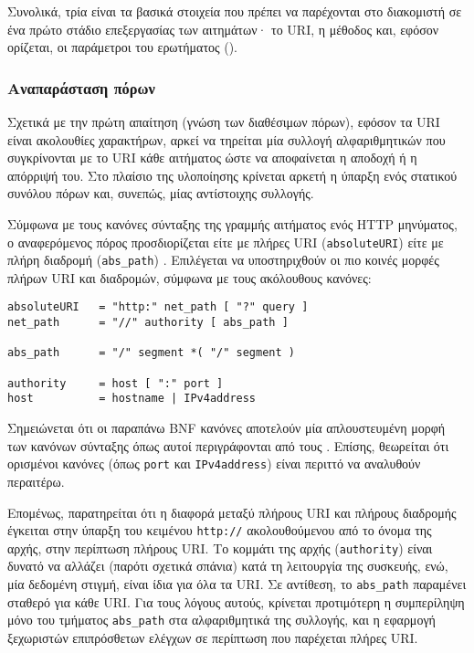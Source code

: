 Συνολικά, τρία είναι τα βασικά στοιχεία που πρέπει να παρέχονται στο διακομιστή
σε ένα πρώτο στάδιο επεξεργασίας των αιτημάτων· το URI, η μέθοδος και, εφόσον
ορίζεται, οι παράμετροι του ερωτήματος ().

\subsubsection{Αναπαράσταση πόρων}

Σχετικά με την πρώτη απαίτηση (γνώση των διαθέσιμων πόρων),
εφόσον τα URI είναι ακολουθίες χαρακτήρων, αρκεί να τηρείται μία συλλογή
αλφαριθμητικών που συγκρίνονται με το URI κάθε αιτήματος ώστε να αποφαίνεται η
αποδοχή ή η απόρριψή του. Στο πλαίσιο της υλοποίησης κρίνεται αρκετή η ύπαρξη
ενός στατικού συνόλου πόρων και, συνεπώς, μίας αντίστοιχης συλλογής.

Σύμφωνα με τους κανόνες σύνταξης της γραμμής αιτήματος ενός HTTP μηνύματος, ο
αναφερόμενος πόρος προσδιορίζεται είτε με πλήρες URI (\verb~absoluteURI~) είτε
με πλήρη διαδρομή (\verb~abs_path~) \parencite[36--37]{rfc2616}.
Επιλέγεται να υποστηριχθούν οι πιο κοινές μορφές πλήρων URI και διαδρομών,
σύμφωνα με τους ακόλουθους κανόνες:
\begin{lstlisting}
absoluteURI   = "http:" net_path [ "?" query ]
net_path      = "//" authority [ abs_path ]

abs_path      = "/" segment *( "/" segment )

authority     = host [ ":" port ]
host          = hostname | IPv4address
\end{lstlisting}
Σημειώνεται ότι οι παραπάνω BNF κανόνες αποτελούν μία απλουστευμένη μορφή των
κανόνων σύνταξης όπως αυτοί περιγράφονται από τους \textcite[27--28]{rfc2396}.
Επίσης, θεωρείται ότι ορισμένοι κανόνες (όπως \verb~port~ και 
\verb~IPv4address~) είναι περιττό να αναλυθούν περαιτέρω.

Επομένως, παρατηρείται ότι η διαφορά μεταξύ πλήρους URI και πλήρους διαδρομής
έγκειται στην ύπαρξη του κειμένου \verb~http://~ ακολουθούμενου από το όνομα της
αρχής, στην περίπτωση πλήρους URI. Το κομμάτι της αρχής (\verb~authority~) είναι
δυνατό να αλλάζει (παρότι σχετικά σπάνια) κατά τη λειτουργία της συσκευής, ενώ,
μία δεδομένη στιγμή, είναι ίδια για όλα τα URI. Σε αντίθεση, το \verb~abs_path~
παραμένει σταθερό για κάθε URI. Για τους λόγους αυτούς, κρίνεται προτιμότερη η
συμπερίληψη μόνο του τμήματος \verb~abs_path~ στα αλφαριθμητικά της συλλογής,
και η εφαρμογή ξεχωριστών επιπρόσθετων ελέγχων σε περίπτωση που παρέχεται πλήρες
URI.

